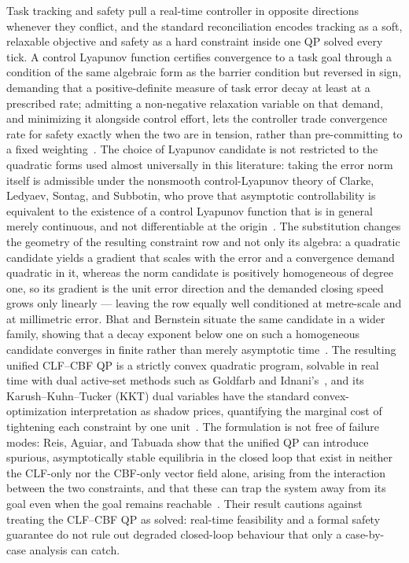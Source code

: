\documentclass[12pt,a4paper,twoside,openright]{report}
\begin{document}
Task tracking and safety pull a real-time controller in opposite directions whenever they conflict, and the standard reconciliation encodes tracking as a soft, relaxable objective and safety as a hard constraint inside one QP solved every tick. A control Lyapunov function certifies convergence to a task goal through a condition of the same algebraic form as the barrier condition but reversed in sign, demanding that a positive-definite measure of task error decay at least at a prescribed rate; admitting a non-negative relaxation variable on that demand, and minimizing it alongside control effort, lets the controller trade convergence rate for safety exactly when the two are in tension, rather than pre-committing to a fixed weighting~\cite{ames2017cbf}. The choice of Lyapunov candidate is not restricted to the quadratic forms used almost universally in this literature: taking the error norm itself is admissible under the nonsmooth control-Lyapunov theory of Clarke, Ledyaev, Sontag, and Subbotin, who prove that asymptotic controllability is equivalent to the existence of a control Lyapunov function that is in general merely continuous, and not differentiable at the origin~\cite{clarke1997asymptotic}. The substitution changes the geometry of the resulting constraint row and not only its algebra: a quadratic candidate yields a gradient that scales with the error and a convergence demand quadratic in it, whereas the norm candidate is positively homogeneous of degree one, so its gradient is the unit error direction and the demanded closing speed grows only linearly --- leaving the row equally well conditioned at metre-scale and at millimetric error. Bhat and Bernstein situate the same candidate in a wider family, showing that a decay exponent below one on such a homogeneous candidate converges in finite rather than merely asymptotic time~\cite{bhat2000finitetime}. The resulting unified CLF--CBF QP is a strictly convex quadratic program, solvable in real time with dual active-set methods such as Goldfarb and Idnani's~\cite{goldfarb1983}, and its Karush--Kuhn--Tucker (KKT) dual variables have the standard convex-optimization interpretation as shadow prices, quantifying the marginal cost of tightening each constraint by one unit~\cite{boyd2004}. The formulation is not free of failure modes: Reis, Aguiar, and Tabuada show that the unified QP can introduce spurious, asymptotically stable equilibria in the closed loop that exist in neither the CLF-only nor the CBF-only vector field alone, arising from the interaction between the two constraints, and that these can trap the system away from its goal even when the goal remains reachable~\cite{reis2021undesirable}. Their result cautions against treating the CLF--CBF QP as solved: real-time feasibility and a formal safety guarantee do not rule out degraded closed-loop behaviour that only a case-by-case analysis can catch.
\end{document}
